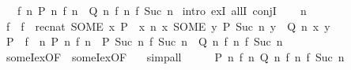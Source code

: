 \begin{isabellebody}
\ \ \ {\isachardoublequoteopen}{\isasymexists}f{\isachardot}{\kern0pt}\ {\isasymforall}n{\isachardot}{\kern0pt}\ P\ n\ {\isacharparenleft}{\kern0pt}f\ n{\isacharparenright}{\kern0pt}\ {\isasymand}\ Q\ n\ {\isacharparenleft}{\kern0pt}f\ n{\isacharparenright}{\kern0pt}\ {\isacharparenleft}{\kern0pt}f\ {\isacharparenleft}{\kern0pt}Suc\ n{\isacharparenright}{\kern0pt}{\isacharparenright}{\kern0pt}{\isachardoublequoteclose}\isanewline
%
\isadelimproof
%
\endisadelimproof
%
\isatagproof
{}\isamarkupfalse%
\ {\isacharparenleft}{\kern0pt}intro\ exI\ allI\ conjI{\isacharparenright}{\kern0pt}\isanewline
\ \ \isamarkupfalse%
\ n\isanewline
\ \ \isamarkupfalse%
\ f\ \ {\isachardoublequoteopen}f\ {\isacharequal}{\kern0pt}\ rec{\isacharunderscore}{\kern0pt}nat\ {\isacharparenleft}{\kern0pt}SOME\ x{\isachardot}{\kern0pt}\ P\ {}\ x{\isacharparenright}{\kern0pt}\ {\isacharparenleft}{\kern0pt}{\isasymlambda}n\ x{\isachardot}{\kern0pt}\ SOME\ y{\isachardot}{\kern0pt}\ P\ {\isacharparenleft}{\kern0pt}Suc\ n{\isacharparenright}{\kern0pt}\ y\ {\isasymand}\ Q\ n\ x\ y{\isacharparenright}{\kern0pt}{\isachardoublequoteclose}\isanewline
\ \ \isamarkupfalse%
\ \isamarkupfalse%
\ {\isachardoublequoteopen}P\ {}\ {\isacharparenleft}{\kern0pt}f\ {}{\isacharparenright}{\kern0pt}{\isachardoublequoteclose}\ {\isachardoublequoteopen}{\isasymAnd}n{\isachardot}{\kern0pt}\ P\ n\ {\isacharparenleft}{\kern0pt}f\ n{\isacharparenright}{\kern0pt}\ {\isasymLongrightarrow}\ P\ {\isacharparenleft}{\kern0pt}Suc\ n{\isacharparenright}{\kern0pt}\ {\isacharparenleft}{\kern0pt}f\ {\isacharparenleft}{\kern0pt}Suc\ n{\isacharparenright}{\kern0pt}{\isacharparenright}{\kern0pt}\ {\isasymand}\ Q\ n\ {\isacharparenleft}{\kern0pt}f\ n{\isacharparenright}{\kern0pt}\ {\isacharparenleft}{\kern0pt}f\ {\isacharparenleft}{\kern0pt}Suc\ n{\isacharparenright}{\kern0pt}{\isacharparenright}{\kern0pt}{\isachardoublequoteclose}\isanewline
\ \ \ \ \isamarkupfalse%
\ someI{\isacharunderscore}{\kern0pt}ex{\isacharbrackleft}{\kern0pt}OF\ {}{\isacharbrackright}{\kern0pt}\ someI{\isacharunderscore}{\kern0pt}ex{\isacharbrackleft}{\kern0pt}OF\ {}{\isacharbrackright}{\kern0pt}\ \isamarkupfalse%
\ simp{\isacharunderscore}{\kern0pt}all\isanewline
\ \ \isamarkupfalse%
\ \isamarkupfalse%
\ {\isachardoublequoteopen}P\ n\ {\isacharparenleft}{\kern0pt}f\ n{\isacharparenright}{\kern0pt}{\isachardoublequoteclose}\ {\isachardoublequoteopen}Q\ n\ {\isacharparenleft}{\kern0pt}f\ n{\isacharparenright}{\kern0pt}\ {\isacharparenleft}{\kern0pt}f\ {\isacharparenleft}{\kern0pt}Suc\ n{\isacharparenright}{\kern0pt}{\isacharparenright}{\kern0pt}{\isachardoublequoteclose}\isanewline

\end{isabellebody}
